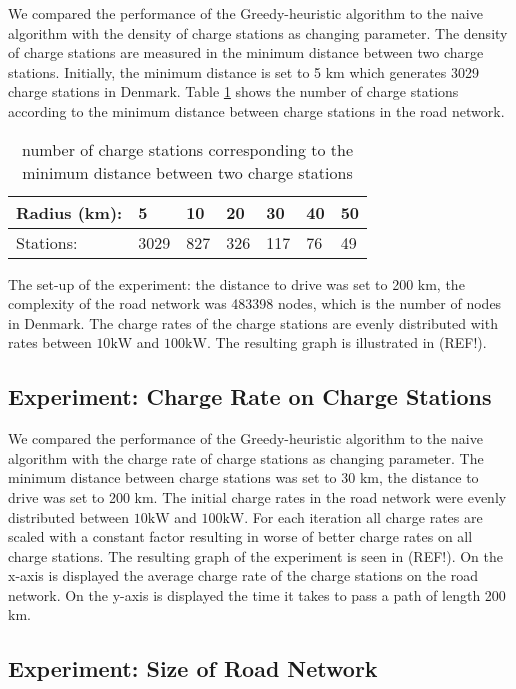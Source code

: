 We compared the performance of the Greedy-heuristic algorithm to the naive algorithm with the density of charge stations as changing parameter. The
density of charge stations are measured in the minimum distance between two charge stations. Initially, the minimum distance is set to 5 km which generates 3029 charge stations in Denmark. Table \ref{table:chargedensity} shows the number of charge stations according to the minimum distance between charge stations in the road network.

\begin{table}[!htb]
\centering
		\begin{tabular}{ p{1.85cm} p{0.67cm} p{0.63cm} p{0.63cm} p{0.63cm} p{0.63cm} p{0.63cm} } \hline
		Radius (km): & 5 & 10 & 20 & 30 & 40 & 50 \\ \hline
		Stations: & 3029 & 827 & 326 & 117 & 76 & 49 \\ \hline 
		\end{tabular}
		\caption{number of charge stations corresponding to the minimum distance between two charge stations}
	\label{table:chargedensity}
	\end{table}

The set-up of the experiment: the distance to drive was set to 200 km, the complexity of the road network was 483398 nodes, which is the number of nodes in Denmark. The charge rates of the charge stations are evenly distributed with rates between $10 \si{\kW}$ and $100 \si{\kW}$. The resulting graph is illustrated in (REF!).

\subsection{Experiment: Charge Rate on Charge Stations}

We compared the performance of the Greedy-heuristic algorithm to the naive algorithm with the charge rate of charge stations as changing parameter. The minimum distance between charge stations was set to 30 km, the distance to drive was set to 200 km. The initial charge rates in the road network were evenly distributed between $10 \si{\kW}$ and $100 \si{\kW}$. For each iteration all charge rates are scaled with a constant factor resulting in worse of better charge rates on all charge stations. The resulting graph of the experiment is seen in (REF!). On the x-axis is displayed the average charge rate of the charge stations on the road network. On the y-axis is displayed the time it takes to pass a path of length 200 km. 

\subsection{Experiment: Size of Road Network}

